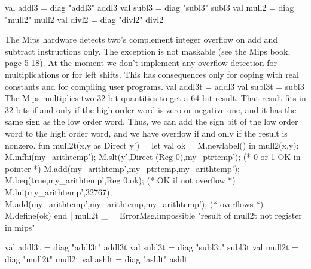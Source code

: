 \endcode
{}
\endmoddef
val addl3 = diag "addl3" addl3
val subl3 = diag "subl3" subl3
val mull2 = diag "mull2" mull2
val divl2 = diag "divl2" divl2


\endcode
{}
The Mips hardware detects two's complement integer overflow on 
add and subtract instructions only.  
The exception is not maskable (see the Mips book, page 5-18).
At the moment we don't implement any overflow detection for multiplications
or for left shifts.
This has consequences only for coping with real constants and for
compiling user programs.  
\enddocs
{}
\endmoddef
val addl3t = addl3
val subl3t = subl3
\endcode
{}
The Mips multiplies two 32-bit quantities to get a 64-bit result.
That result fits in 32 bits if and only if the high-order word is zero or
negative one, and it has the same sign as the low order word.
Thus, we can add the sign bit of the low order word to the high order
word, and we have overflow if and only if the result is nonzero.
\enddocs
{}
\endmoddef
fun mull2t(x,y as Direct y') = 
    let val ok = M.newlabel()
    in  mull2(x,y);
        M.mfhi(my_arithtemp');
        M.slt(y',Direct (Reg 0),my_ptrtemp'); (* 0 or 1 OK in pointer *)
        M.add(my_arithtemp',my_ptrtemp,my_arithtemp');
        M.beq(true,my_arithtemp',Reg 0,ok);    (* OK if not overflow *)
        M.lui(my_arithtemp',32767);
        M.add(my_arithtemp',my_arithtemp,my_arithtemp');  (* overflows *)
        M.define(ok)
    end
  | mull2t _ = ErrorMsg.impossible "result of mull2t not register in mips"

\endcode
{}
\endmoddef
val addl3t = diag "addl3t" addl3t
val subl3t = diag "subl3t" subl3t
val mull2t = diag "mull2t" mull2t
val ashlt = diag "ashlt" ashlt


